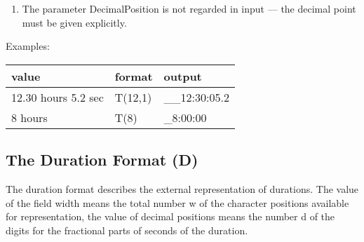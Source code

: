 \begin{enumerate}
\begin{enumerate}

\item The parameter DecimalPosition is not regarded in input
 --- the decimal point must be given explicitly.
\end{enumerate}
\end{enumerate}

Examples:

\begin{tabular}{lll}
value               & format  & output \\ \hline
12.30 hours 5.2 sec & T(12,1) & \_\_12:30:05.2 \\
8 hours             & T(8)    & \_8:00:00
\end{tabular}

\subsection{The Duration Format (D)}   %
\label{sec_dation_d_format}




The duration format describes the external representation of durations.
The value of the field width means the total number w of the character
positions available for representation, the value of decimal positions
means the number d of the digits for the fractional parts of seconds of
the duration.

